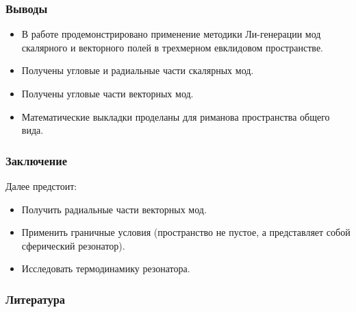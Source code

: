 \documentclass{beamer}
\begin{document}

    \begin{frame}\frametitle{Выводы}

        \begin{itemize}
            \item В работе продемонстрировано применение методики Ли-генерации мод скалярного и векторного полей в трехмерном евклидовом пространстве.

            \item Получены угловые и радиальные части скалярных мод.

            \item Получены угловые части векторных мод.

            \item Математические выкладки проделаны для риманова пространства общего вида.
        \end{itemize}

    \end{frame}


    \begin{frame}\frametitle{Заключение}

        Далее предстоит:
        \begin{itemize}
            \item Получить радиальные части векторных мод.

            \item Применить граничные условия (пространство не пустое, а представляет собой сферический резонатор).

            \item Исследовать термодинамику резонатора.
        \end{itemize}

    \end{frame}


    \begin{frame}\frametitle{Литература}
        
        
    \end{frame}
\end{document}
